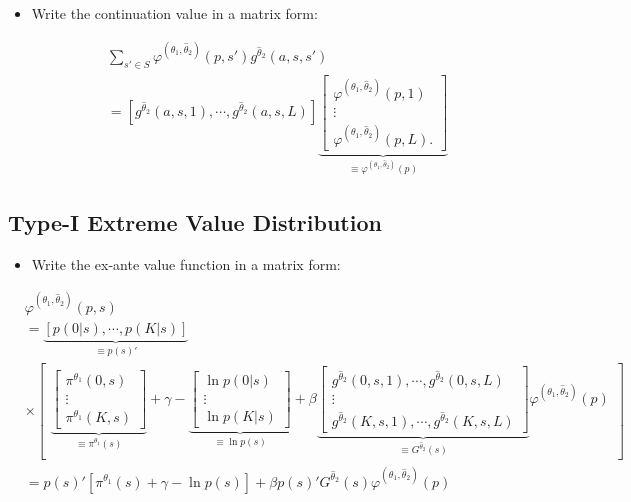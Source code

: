 \documentclass[]{book}
\providecommand{\tightlist}{%
  \setlength{\itemsep}{0pt}\setlength{\parskip}{0pt}}
\begin{document}
\begin{itemize}
\tightlist
\item
  Write the continuation value in a matrix form:

  \begin{equation}
  \begin{split}
  & \sum_{s' \in S} \varphi^{(\theta_1, \hat{\theta}_2)}(p, s') g^{\hat{\theta}_2}(a, s, s')\\
  & = [g^{\hat{\theta}_2}(a, s, 1), \cdots, g^{\hat{\theta}_2}(a, s, L)] 
  \underbrace{\begin{bmatrix}
  \varphi^{(\theta_1, \hat{\theta}_2)}(p, 1)\\
  \vdots\\
  \varphi^{(\theta_1, \hat{\theta}_2)}(p, L).
  \end{bmatrix}}_{\equiv \varphi^{(\theta_1, \hat{\theta}_2)}(p)}
  \end{split}
  \end{equation}
\end{itemize}

\subsection{Type-I Extreme Value
Distribution}\label{type-i-extreme-value-distribution-4}

\begin{itemize}
\tightlist
\item
  Write the ex-ante value function in a matrix form:
\end{itemize}

\begin{equation}
\begin{split}
&\varphi^{(\theta_1, \hat{\theta}_2)}(p, s)\\
&=\underbrace{[p(0|s), \cdots, p(K|s)]}_{\equiv p(s)'} \\
&\times\begin{bmatrix}
\underbrace{\begin{bmatrix}
\pi^{\theta_1}(0, s)\\
\vdots\\
\pi^{\theta_1}(K, s)
\end{bmatrix}}_{\equiv \pi^{\theta_1}(s)}
+ \gamma
-
\underbrace{\begin{bmatrix}
\ln p(0|s)\\
\vdots\\
\ln p(K|s)
\end{bmatrix}}_{\equiv \ln p(s)}
+\beta
\underbrace{\begin{bmatrix}
g^{\hat{\theta}_2}(0, s, 1), \cdots, g^{\hat{\theta}_2}(0, s, L)\\
\vdots\\
g^{\hat{\theta}_2}(K, s, 1), \cdots, g^{\hat{\theta}_2}(K, s, L)
\end{bmatrix}}_{\equiv G^{\hat{\theta}_2}(s)}
\varphi^{(\theta_1, \hat{\theta}_2)}(p)
\end{bmatrix}\\
&=p(s)'[\pi^{\theta_1}(s) + \gamma - \ln p(s)] + \beta p(s)' G^{\hat{\theta}_2}(s)  \varphi^{(\theta_1, \hat{\theta}_2)}(p)
\end{split}
\end{equation}
\end{document}
